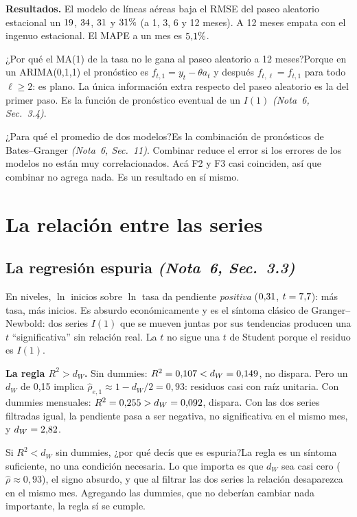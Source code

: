 \documentclass[11pt,a4paper]{article}
\newcommand{\nota}[2]{\textit{(Nota~#1, Sec.~#2)}}
\newcommand{\Q}[2]{\begin{pregunta}{#1}#2\end{pregunta}}
\begin{document}
\textbf{Resultados.} El modelo de l\'ineas a\'ereas baja el RMSE del paseo aleatorio estacional un $19$, $34$, $31$ y $31\%$ (a 1, 3, 6 y 12 meses). A 12 meses empata con el ingenuo estacional. El MAPE a un mes es $5{,}1\%$.

\Q{¿Por qu\'e el MA(1) de la tasa no le gana al paseo aleatorio a 12 meses?}{Porque en un ARIMA(0,1,1) el pron\'ostico es $f_{t,1}=y_t-\theta a_t$ y despu\'es $f_{t,\ell}=f_{t,1}$ para todo $\ell\ge2$: es plano. La \'unica informaci\'on extra respecto del paseo aleatorio es la del primer paso. Es la funci\'on de pron\'ostico eventual de un $I(1)$ \nota{6}{3.4}.}

\Q{¿Para qu\'e el promedio de dos modelos?}{Es la combinaci\'on de pron\'osticos de Bates--Granger \nota{6}{11}. Combinar reduce el error si los errores de los modelos no est\'an muy correlacionados. Ac\'a F2 y F3 casi coinciden, as\'i que combinar no agrega nada. Es un resultado en s\'i mismo.}

\section{La relaci\'on entre las series}

\subsection{La regresi\'on espuria \nota{6}{3.3}}
En niveles, $\ln$ inicios sobre $\ln$ tasa da pendiente \emph{positiva} ($0{,}31$, $t=7{,}7$): m\'as tasa, m\'as inicios. Es absurdo econ\'omicamente y es el s\'intoma cl\'asico de Granger--Newbold: dos series $I(1)$ que se mueven juntas por sus tendencias producen una $t$ ``significativa'' sin relaci\'on real. La $t$ no sigue una $t$ de Student porque el residuo es $I(1)$.

\textbf{La regla $R^2>d_W$.} Sin dummies: $R^2=0{,}107<d_W=0{,}149$, no dispara. Pero un $d_W$ de 0,15 implica $\hat\rho_{e,1}\approx1-d_W/2=0{,}93$: residuos casi con ra\'iz unitaria. Con dummies mensuales: $R^2=0{,}255>d_W=0{,}092$, dispara. Con las dos series filtradas igual, la pendiente pasa a ser negativa, no significativa en el mismo mes, y $d_W=2{,}82$.

\Q{Si $R^2<d_W$ sin dummies, ¿por qu\'e dec\'is que es espuria?}{La regla es un s\'intoma suficiente, no una condici\'on necesaria. Lo que importa es que $d_W$ sea casi cero ($\hat\rho\approx0{,}93$), el signo absurdo, y que al filtrar las dos series la relaci\'on desaparezca en el mismo mes. Agregando las dummies, que no deber\'ian cambiar nada importante, la regla s\'i se cumple.}
\end{document}
